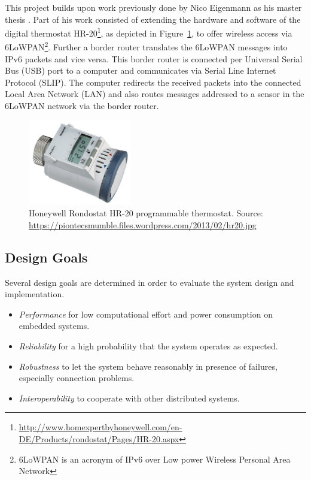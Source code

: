 This project builds upon work previously done by Nico Eigenmann as his master thesis \cite{eigenmann2012opportunisticSensing}.
Part of his work consisted of extending the hardware and software of the digital thermostat HR-20\footnote{\url{http://www.homexpertbyhoneywell.com/en-DE/Products/rondostat/Pages/HR-20.aspx}}, as depicted in Figure~\ref{fig:honeywell_hr20}, to offer wireless access via 6LoWPAN\footnote{6LoWPAN is an acronym of IPv6 over Low power Wireless Personal Area Network}.
Further a border router translates the 6LoWPAN messages into IPv6 packets and vice versa.
This border router is connected per Universal Serial Bus (USB) port to a computer and communicates via Serial Line Internet Protocol (SLIP).
The computer redirects the received packets into the connected Local Area Network (LAN) and also routes messages addressed to a sensor in the 6LoWPAN network via the border router.

\begin{figure}[h]
	\begin{center}
		\includegraphics[width=0.4\textwidth]{images/hr20.jpg}
	\end{center}
	\caption{Honeywell Rondostat HR-20 programmable thermostat. Source: \url{https://piontecsmumble.files.wordpress.com/2013/02/hr20.jpg}}
	\label{fig:honeywell_hr20}
\end{figure}

\subsection{Design Goals}
\label{sec:local_infrastructure_design_goals}

Several design goals are determined in order to evaluate the system design and implementation.

\begin{itemize}
	\item \emph{Performance} for low computational effort and power consumption on embedded systems.
	\item \emph{Reliability} for a high probability that the system operates as expected.
	\item \emph{Robustness} to let the system behave reasonably in presence of failures, especially connection problems.
	\item \emph{Interoperability} to cooperate with other distributed systems.
\end{itemize}

